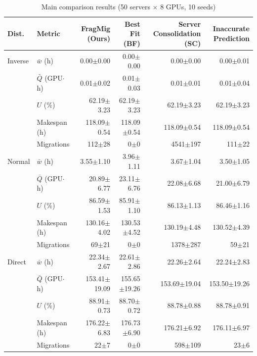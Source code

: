 \begin{table}[htbp]
\centering
\caption{Main comparison results (50 servers $\times$ 8 GPUs, 10 seeds)}
\label{tab:gpu_main}
\begin{tabular}{llrrrr}
\toprule
Dist. & Metric & FragMig (Ours) & Best Fit (BF) & Server Consolidation (SC) & Inaccurate Prediction \\
\midrule
Inverse & $\bar{w}$ (h) & 0.00$\pm$0.00 & 0.00$\pm$0.00 & 0.00$\pm$0.00 & 0.00$\pm$0.01 \\
 & $\bar{Q}$ (GPU$\cdot$h) & 0.01$\pm$0.02 & 0.01$\pm$0.03 & 0.01$\pm$0.01 & 0.01$\pm$0.04 \\
 & $U$ (\%) & 62.19$\pm$3.23 & 62.19$\pm$3.23 & 62.19$\pm$3.23 & 62.19$\pm$3.23 \\
 & Makespan (h) & 118.09$\pm$0.54 & 118.09$\pm$0.54 & 118.09$\pm$0.54 & 118.09$\pm$0.54 \\
 & Migrations & 112$\pm$28 & 0$\pm$0 & 4541$\pm$197 & 111$\pm$22 \\
\midrule
Normal & $\bar{w}$ (h) & 3.55$\pm$1.10 & 3.96$\pm$1.11 & 3.67$\pm$1.04 & 3.50$\pm$1.05 \\
 & $\bar{Q}$ (GPU$\cdot$h) & 20.89$\pm$6.77 & 23.11$\pm$6.76 & 22.08$\pm$6.68 & 21.00$\pm$6.79 \\
 & $U$ (\%) & 86.59$\pm$1.53 & 85.91$\pm$1.10 & 86.13$\pm$1.13 & 86.46$\pm$1.16 \\
 & Makespan (h) & 130.16$\pm$4.02 & 130.53$\pm$4.52 & 130.19$\pm$4.48 & 130.52$\pm$4.39 \\
 & Migrations & 69$\pm$21 & 0$\pm$0 & 1378$\pm$287 & 59$\pm$21 \\
\midrule
Direct & $\bar{w}$ (h) & 22.34$\pm$2.67 & 22.61$\pm$2.86 & 22.26$\pm$2.64 & 22.24$\pm$2.83 \\
 & $\bar{Q}$ (GPU$\cdot$h) & 153.41$\pm$19.09 & 155.65$\pm$19.26 & 153.69$\pm$19.04 & 153.50$\pm$19.26 \\
 & $U$ (\%) & 88.91$\pm$0.73 & 88.70$\pm$0.72 & 88.78$\pm$0.88 & 88.78$\pm$0.91 \\
 & Makespan (h) & 176.22$\pm$6.83 & 176.73$\pm$6.90 & 176.21$\pm$6.92 & 176.11$\pm$6.97 \\
 & Migrations & 22$\pm$7 & 0$\pm$0 & 598$\pm$109 & 23$\pm$6 \\
\bottomrule
\end{tabular}
\end{table}